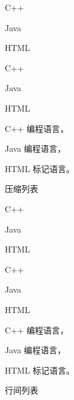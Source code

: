 \begin{example}[!h]
\begin{RLDemo}[numbers=left]
\begin{compactitem}
    \item C++
    \item Java 
    \item HTML
\end{compactitem}
\end{RLDemo}
\begin{RLDemo}[numbers=left]
\begin{compactenum}
    \item C++
    \item Java 
    \item HTML
\end{compactenum}
\end{RLDemo}
\begin{RLDemo}[numbers=left]
\begin{compactdesc}
    \item[C++] 编程语言，
    \item[Java] 编程语言，
    \item[HTML] 标记语言。
\end{compactdesc}
\end{RLDemo}
\caption{压缩列表}
\label{exa:compact_list}
\end{example}

\begin{example}[!h]
\begin{RLDemo}[numbers=left]
\begin{inparaitem}
    \item C++
    \item Java 
    \item HTML
\end{inparaitem}
\end{RLDemo}
\begin{RLDemo}[numbers=left]
\begin{inparaenum}
    \item C++
    \item Java 
    \item HTML
\end{inparaenum}
\end{RLDemo}
\begin{RLDemo}[numbers=left]
\begin{inparadesc}
    \item[C++] 编程语言，
    \item[Java] 编程语言，
    \item[HTML] 标记语言。
\end{inparadesc}
\end{RLDemo}
\caption{行间列表}
\label{exa:inline_list}
\end{example}

